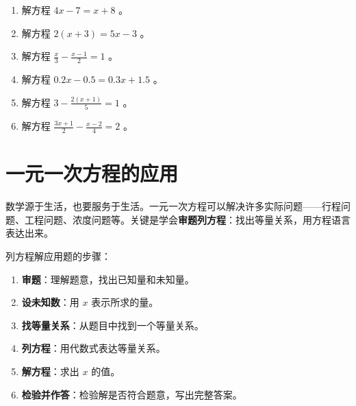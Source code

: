 \begin{practice}


\begin{enumerate}
  \item 解方程 $4x - 7 = x + 8$ 。
  \item 解方程 $2(x + 3) = 5x - 3$ 。
  \item 解方程 $\frac{x}{3} - \frac{x - 1}{2} = 1$ 。
  \item 解方程 $0.2x - 0.5 = 0.3x + 1.5$ 。
  \item 解方程 $3 - \frac{2(x+1)}{5} = 1$ 。
  \item 解方程 $\frac{3x + 1}{2} - \frac{x - 2}{4} = 2$ 。
\end{enumerate}


\end{practice}

\section*{一元一次方程的应用}


\begin{explore}


数学源于生活，也要服务于生活。一元一次方程可以解决许多实际问题——行程问题、工程问题、浓度问题等。关键是学会\textbf{审题列方程}：找出等量关系，用方程语言表达出来。

\end{explore}

\begin{understand}


列方程解应用题的步骤：

\begin{enumerate}
  \item \textbf{审题}：理解题意，找出已知量和未知量。
  \item \textbf{设未知数}：用 $x$ 表示所求的量。
  \item \textbf{找等量关系}：从题目中找到一个等量关系。
  \item \textbf{列方程}：用代数式表达等量关系。
  \item \textbf{解方程}：求出 $x$ 的值。
  \item \textbf{检验并作答}：检验解是否符合题意，写出完整答案。
\end{enumerate}


\end{understand}

